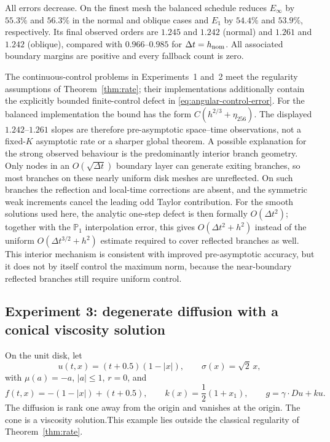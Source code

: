 \documentclass[11pt]{article}
\theoremstyle{definition}
\theoremstyle{remark}
\begin{document}
\FloatBarrier

All errors decrease.  On the finest mesh the balanced schedule reduces
$E_\infty$ by $55.3\%$ and $56.3\%$ in the normal and oblique cases and
$E_1$ by $54.4\%$ and $53.9\%$, respectively.  Its final observed orders are
$1.245$ and $1.242$ (normal) and $1.261$ and $1.242$ (oblique), compared with
$0.966$--$0.985$ for $\Delta t=h_{\rm nom}$.  All associated boundary margins
are positive and every fallback count is zero.

The continuous-control problems in Experiments~1 and~2 meet the regularity
assumptions of Theorem~\ref{thm:rate}; their implementations additionally
contain the explicitly bounded finite-control defect in
\eqref{eq:angular-control-error}.  For the balanced implementation the bound
has the form $C(h^{2/3}+\eta_{256})$.  The displayed $1.242$--$1.261$ slopes
are therefore pre-asymptotic space--time observations, not a fixed-$K$
asymptotic rate or a sharper global theorem.  A possible explanation for the
strong observed behaviour is the predominantly interior branch geometry.
Only nodes in an $O(\sqrt{\Delta t})$ boundary
layer can generate exiting branches, so most branches on these nearly uniform
disk meshes are unreflected.  On such branches the reflection and local-time
corrections are absent, and the symmetric weak increments cancel the leading
odd Taylor contribution.  For the smooth solutions used here, the analytic
one-step defect is then formally $O(\Delta t^2)$; together with the
$\mathbb P_1$ interpolation error, this gives $O(\Delta t^2+h^2)$ instead of
the uniform $O(\Delta t^{3/2}+h^2)$ estimate required to cover reflected
branches as well.  This interior mechanism is consistent with improved
pre-asymptotic accuracy, but it does not by itself control the maximum norm,
because the near-boundary reflected branches still require uniform control.

\FloatBarrier

\subsection{Experiment 3: degenerate diffusion with a conical viscosity solution}
\label{sec:conical-test}

On the unit disk, let
\[
 u(t,x)=(t+0.5)(1-|x|),\qquad \sigma(x)=\sqrt2\,x,
\]
with $\mu(a)=-a$, $|a|\le1$, $r=0$, and
\[
 f(t,x)=-(1-|x|)+(t+0.5),\qquad
 k(x)=\frac12(1+x_1),\qquad g=\gamma\cdot Du+ku.
\]
The diffusion is rank one away from the origin and vanishes at the origin.
The cone is a viscosity solution.This example lies outside the classical regularity of
Theorem~\ref{thm:rate}.
\end{document}
